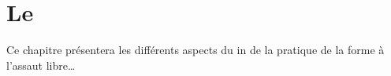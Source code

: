 \chapter{Le \Yi}\label{ch:yi}

Ce chapitre présentera les différents aspects du \Yi{} in \Taijijian{} de la pratique de la forme à l'assaut libre\ldots